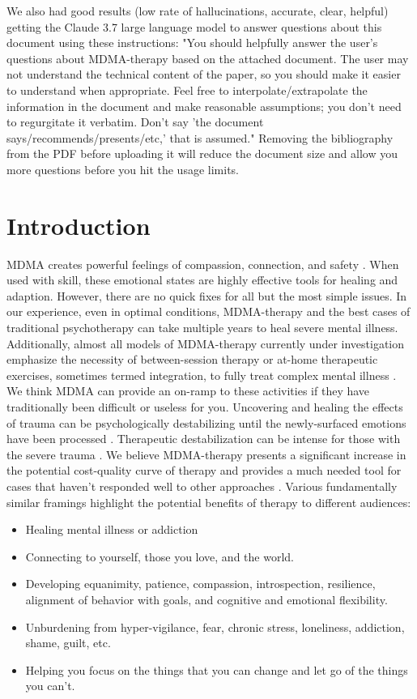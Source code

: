 \documentclass[12pt,letterpaper]{book}
\begin{document}
We also had good results (low rate of hallucinations, accurate, clear, helpful) getting the Claude 3.7 large language model to answer questions about this document using these instructions: "You should helpfully answer the user's questions about MDMA-therapy based on the attached document. The user may not understand the technical content of the paper, so you should make it easier to understand when appropriate. Feel free to interpolate/extrapolate the information in the document and make reasonable assumptions; you don't need to regurgitate it verbatim. Don't say 'the document says/recommends/presents/etc,' that is assumed." Removing the bibliography from the PDF before uploading it will reduce the document size and allow you more questions before you hit the usage limits.
\section{Introduction}
\label{sec:introduction}
MDMA creates powerful feelings of compassion, connection, and safety \cite{fedduciaMDMAMemoryReconsolidation}. When used with skill, these emotional states are highly effective tools for healing and adaption. However, there are no quick fixes for all but the most simple issues. In our experience, even in optimal conditions, MDMA-therapy and the best cases of traditional psychotherapy can take multiple years to heal severe mental illness. Additionally, almost all models of MDMA-therapy currently under investigation emphasize the necessity of between-session therapy or at-home therapeutic exercises, sometimes termed integration, to fully treat complex mental illness \cite{bathje2022Integration}. We think MDMA can provide an on-ramp to these activities if they have traditionally been difficult or useless for you. Uncovering and healing the effects of trauma can be psychologically destabilizing until the newly-surfaced emotions have been processed \cite{olthofDestabilization}. Therapeutic destabilization can be intense for those with the severe trauma \cite{studyingHarms}. We believe MDMA-therapy presents a significant increase in the potential cost-quality curve of therapy and provides a much needed tool for cases that haven't responded well to other approaches \cite{mitchellMDMAClinicalTrial2}. Various fundamentally similar framings highlight the potential benefits of therapy to different audiences:
\begin{itemize}
    \item Healing mental illness or addiction
    \item Connecting to yourself, those you love, and the world.
    \item Developing equanimity, patience, compassion, introspection, resilience, alignment of behavior with goals, and cognitive and emotional flexibility.
    \item Unburdening from hyper-vigilance, fear, chronic stress, loneliness, addiction, shame, guilt, etc.
    \item Helping you focus on the things that you can change and let go of the things you can't.
\end{itemize}
\end{document}
